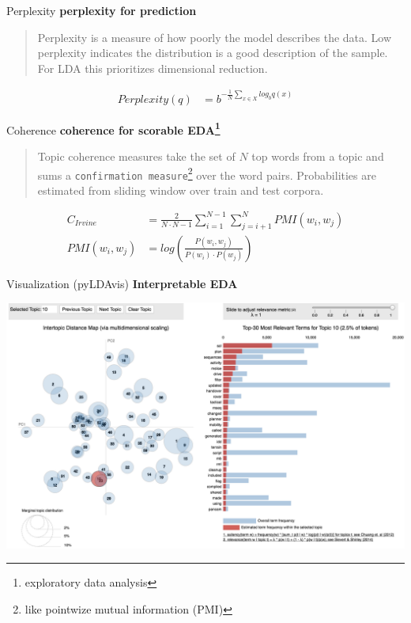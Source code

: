 \documentclass[10pt]{beamer}
\begin{document}
\begin{frame}{Perplexity}
  {\bf perplexity for prediction}

  \begin{quote}
    Perplexity is a measure of how poorly the model describes the data. Low perplexity indicates the distribution is a good description of the sample. For LDA this prioritizes dimensional reduction.
  \end{quote}

  \begin{align*}
    Perplexity(q) &= b^{-\frac{1}{N}\sum_{x \in X} log_b q(x)}
  \end{align*}

\end{frame}

\begin{frame}{Coherence}
  {\bf coherence for scorable EDA\footnote{exploratory data analysis}}
  \begin{quote}
    Topic coherence measures take the set of $N$ top words from a topic and sums a \texttt{confirmation measure}\footnote{like pointwize mutual information (PMI)} over the word pairs. Probabilities are estimated from sliding window over train and test corpora.
  \end{quote}

  \begin{align*}
    C_{Irvine} &= \frac{2}{N\cdot N-1}\sum_{i=1}^{N-1}\sum_{j=i+1}^N PMI(w_i, w_j)\\
    PMI(w_i, w_j) &= log(\frac{P(w_i, w_j)}{P(w_i)\cdot P(w_j)})
  \end{align*}
\end{frame}

\begin{frame}{Visualization (pyLDAvis)}
  {\bf Interpretable EDA}

    \includegraphics[width=\textwidth]{LDAvis.png}

\end{frame}
\end{document}
